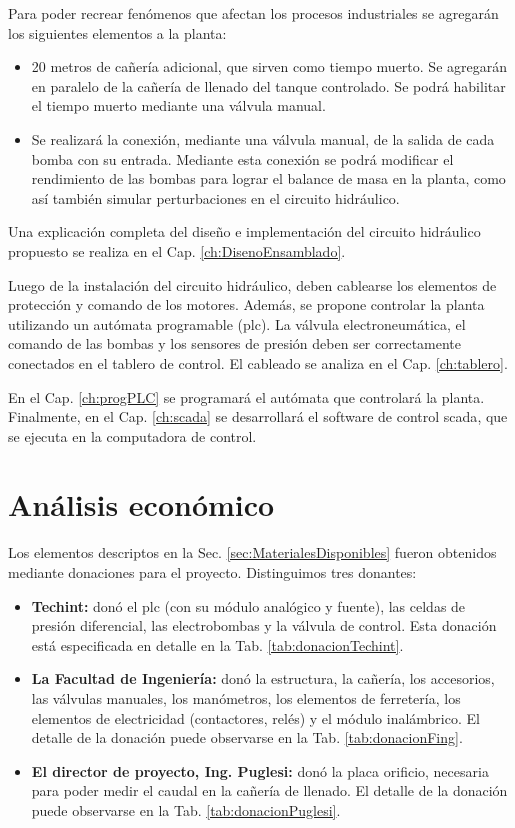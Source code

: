 Para poder recrear fenómenos que afectan los procesos industriales se agregarán
los siguientes elementos a la planta:
\begin{itemize}
\item 20 metros de cañería adicional, que sirven como tiempo
muerto.
Se agregarán en paralelo de la cañería de llenado del tanque controlado.
Se podrá habilitar el tiempo muerto mediante una válvula manual.

\item Se realizará la conexión, mediante una válvula manual, de la salida de
cada bomba con su entrada. Mediante esta conexión se podrá modificar el
rendimiento de las bombas para lograr el balance de masa en la planta, como así
también simular perturbaciones en el circuito hidráulico.

\end{itemize}

Una explicación completa del diseño e implementación del circuito hidráulico
propuesto se realiza en el Cap. \ref{ch:DisenoEnsamblado}.

Luego de la instalación del circuito hidráulico, deben cablearse los elementos
de protección y comando de los motores.
Además, se propone controlar la planta utilizando un autómata
programable (\gls{plc}).
La válvula electroneumática, el comando de las bombas y los sensores de presión
deben ser correctamente conectados en el tablero de control.
El cableado se analiza en el Cap. \ref{ch:tablero}.

En el Cap. \ref{ch:progPLC} se programará el autómata que controlará la
planta. Finalmente, en el Cap. \ref{ch:scada} se desarrollará el software
de control \gls{scada}, que se ejecuta en la computadora de control.

\section{Análisis económico}
\label{sec:AnalisisEconomico}
Los elementos descriptos en la Sec. \ref{sec:MaterialesDisponibles} fueron
obtenidos mediante donaciones para el proyecto.
Distinguimos tres donantes:
\begin{itemize}
 \item \textbf{Techint:} donó el \gls{plc} (con su módulo analógico y fuente),
las celdas de presión diferencial, las electrobombas y la válvula de control.
Esta donación está especificada en detalle en la Tab.
\ref{tab:donacionTechint}.
 \item \textbf{La Facultad de Ingeniería:} donó la estructura, la cañería, los
accesorios, las válvulas manuales, los manómetros, los elementos de ferretería,
los elementos de electricidad (contactores, relés) y el módulo inalámbrico.
El detalle de la donación puede observarse en la Tab. \ref{tab:donacionFing}.
\item \textbf{El director de proyecto, Ing. Puglesi:} donó la placa orificio,
necesaria para poder medir el caudal en la cañería de llenado.
El detalle de la donación puede observarse en la Tab.
\ref{tab:donacionPuglesi}.
\end{itemize}

